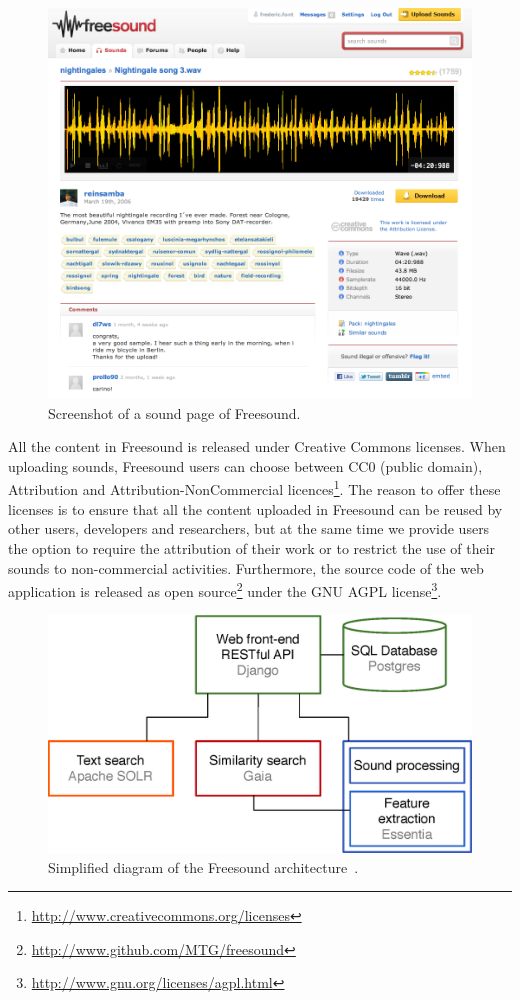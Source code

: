 \begin{figure}
 \centerline{
 \includegraphics[width=0.8\columnwidth]{ch99/pics/freesound_screenshot.png}}
 \caption{Screenshot of a sound page of Freesound.}
 \label{fig:app:screenshot}
\end{figure}

All the content in Freesound is released under Creative Commons licenses. When uploading sounds, Freesound users can choose between CC0 (public domain), Attribution and Attri\-bu\-tion-NonCommercial licences\footnote{\url{http://www.creativecommons.org/licenses}}. The reason to offer these licenses is to ensure that all the content uploaded in Freesound can be reused by other users, developers and researchers, but at the same time we provide users the option to require the attribution of their work or to restrict the use of their sounds to non-commercial activities. Furthermore, the source code of the web application is released as open source\footnote{\url{http://www.github.com/MTG/freesound}} under the GNU AGPL license\footnote{\url{http://www.gnu.org/licenses/agpl.html}}.

\begin{figure}
 \centerline{
 \includegraphics[width=0.7\columnwidth]{ch99/pics/architecture.eps}}
 \caption{Simplified diagram of the Freesound architecture~\citep{Font2013b}.}
 \label{fig:app:architecture}
\end{figure}

